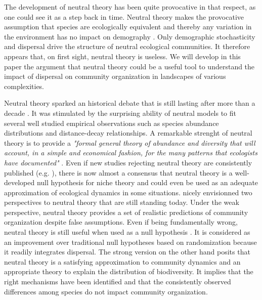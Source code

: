 \documentclass[12pt]{article}
\begin{document}
The development of neutral theory has been quite provocative in that respect, as
one could see it as a step back in time. Neutral theory makes the provocative
assumption that species are ecologically equivalent and thereby any variation in
the environment has no impact on demography \parencite{Bell2000,Hubbell2001}.
Only demographic stochasticity and dispersal drive the structure of neutral
ecological communities. It therefore appears that, on first sight, neutral
theory is useless.  We will develop in this paper the argument that neutral
theory could be a useful tool to understand the impact of dispersal on community
organization in landscapes of various complexities. 

Neutral theory sparked an historical debate that is still lasting after more
than a decade \parencite{Chave2004, Etiennee2011, Rosindell2012,Clark2012}. It
was stimulated by the surprising ability of neutral models to fit several well
studied empirical observations such as species abundance distributions and
distance-decay relationships. A remarkable strenght of neutral theory is to
provide a \emph{"formal general theory of abundance and diversity that will
account, in a simple and economical fashion, for the many patterns that
ecologists have documented"} \parencite{Bell2001}. Even if new studies rejecting
neutral theory are consistently published (e.g.  \textcite{Ricklefs2012}), there
is now almost a consensus that neutral theory is a well-developed null
hypothesis for niche theory and could even be used as an adequate approximation
of ecological dynamics in some situations.  \textcite{Bell2001} nicely
envisionned two perspectives to neutral theory that are still standing today.
Under the weak perspective, neutral theory provides a set of realistic
predictions of community organization despite false assumptions. Even if being
fundamentally wrong, neutral theory is still useful when used as a null
hypothesis \parencite{Gotelli2006}. It is considered as an improvement over
traditional null hypotheses based on randomization \parencite{Gotelli2000}
because it readily integrates dispersal. The strong version on the other hand
posits that neutral theory is a satisfying approximation to community dynamics
and an appropriate theory to explain the distribution of biodiversity. It
implies that the right mechanisms have been identified and that the consistently
observed differences among species do not impact community organization. 
\end{document}
